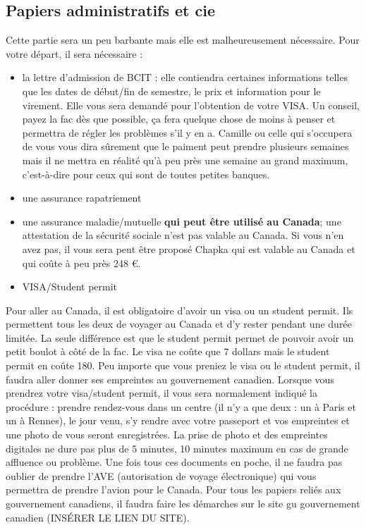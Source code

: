 \documentclass{article}
\begin{document}
\subsection{Papiers administratifs et cie}
Cette partie sera un peu barbante mais elle est malheureusement nécessaire. Pour votre départ, il sera nécessaire :
\begin{itemize}
    \item la lettre d'admission de BCIT : elle contiendra certaines informations telles que les dates de début/fin de semestre, le prix et information pour le virement. Elle vous sera demandé pour l'obtention de votre VISA. Un conseil, payez la fac dès que possible, ça fera quelque chose de moins à penser et permettra de régler les problèmes s'il y en a. Camille ou celle qui s'occupera de vous vous dira sûrement que le paiment peut prendre plusieurs semaines mais il ne mettra en réalité qu'à peu près une semaine au grand maximum, c'est-à-dire pour ceux qui sont de toutes petites banques.
    \item une assurance rapatriement
    \item une assurance maladie/mutuelle \textbf{qui peut être utilisé au Canada}; une attestation de la sécurité sociale n'est pas valable au Canada. Si vous n'en avez pas, il vous sera peut être proposé Chapka qui est valable au Canada et qui coûte à peu près 248 €.
    \item VISA/Student permit
\end{itemize}

Pour aller au Canada, il est obligatoire d'avoir un visa ou un student permit. Ils permettent tous les deux de voyager au Canada et d'y rester pendant une durée limitée. La seule différence est que le student permit permet de pouvoir avoir un petit boulot à côté de la fac. Le visa ne coûte que 7 dollars mais le student permit en coûte 180.\newline
Peu importe que vous preniez le visa ou le student permit, il faudra aller donner ses empreintes au gouvernement canadien. Lorsque vous prendrez votre visa/student permit, il vous sera normalement indiqué la procédure : prendre rendez-vous dans un centre (il n'y a que deux : un à Paris et un à Rennes), le jour venu, s'y rendre avec votre passeport et vos empreintes et une photo de vous seront enregistrées. La prise de photo et des empreintes digitales ne dure pas plus de 5 minutes, 10 minutes maximum en cas de grande affluence ou problème. Une fois tous ces documents en poche, il ne faudra pas oublier de prendre l'AVE (autorisation de voyage électronique) qui vous permettra de prendre l'avion pour le Canada.
Pour tous les papiers reliés aux gouvernement canadiens, il faudra faire les démarches sur le site gu gouvernement canadien (INSÉRER LE LIEN DU SITE). 
\end{document}
